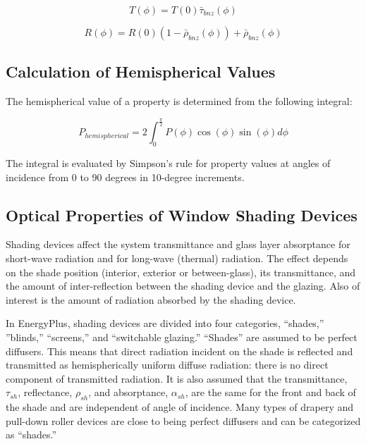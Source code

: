 \begin{equation}
T(\phi ) = T(0){\bar \tau_{bnz}}(\phi )
\end{equation}

\begin{equation}
R(\phi ) = R(0)(1 - {\bar \rho_{bnz}}(\phi )) + {\bar \rho_{bnz}}(\phi )
\end{equation}

\subsection{Calculation of Hemispherical Values}\label{calculation-of-hemispherical-values}

The hemispherical value of a property is determined from the following integral:

\begin{equation}
{P_{hemispherical}} = 2\int_0^{\frac{\pi }{2}} {P(\phi )\cos (\phi )\sin (\phi )d\phi }
\end{equation}

The integral is evaluated by Simpson's rule for property values at angles of incidence from 0 to 90 degrees in 10-degree increments.

\subsection{Optical Properties of Window Shading Devices}\label{optical-properties-of-window-shading-devices}

Shading devices affect the system transmittance and glass layer absorptance for short-wave radiation and for long-wave (thermal) radiation. The effect depends on the shade position (interior, exterior or between-glass), its transmittance, and the amount of inter-reflection between the shading device and the glazing. Also of interest is the amount of radiation absorbed by the shading device.

In EnergyPlus, shading devices are divided into four categories, ``shades,'' ''blinds,'' ``screens,'' and ``switchable glazing.'' ``Shades'' are assumed to be perfect diffusers. This means that direct radiation incident on the shade is reflected and transmitted as hemispherically uniform diffuse radiation: there is no direct component of transmitted radiation. It is also assumed that the transmittance, \(\tau_{sh}\), reflectance, \(\rho_{sh}\), and absorptance, \(\alpha_{sh}\), are the same for the front and back of the shade and are independent of angle of incidence. Many types of drapery and pull-down roller devices are close to being perfect diffusers and can be categorized as ``shades.''

